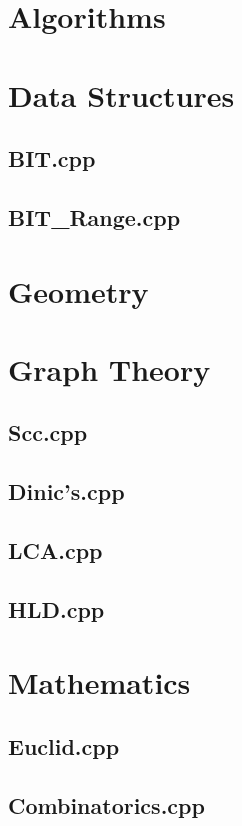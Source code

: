 \section{Algorithms}
\section{Data Structures}
\subsection{BIT.cpp}

\subsection{BIT_Range.cpp}

\section{Geometry}
\section{Graph Theory}
\subsection{Scc.cpp}

\subsection{Dinic's.cpp}

\subsection{LCA.cpp}

\subsection{HLD.cpp}

\section{Mathematics}
\subsection{Euclid.cpp}

\subsection{Combinatorics.cpp}

